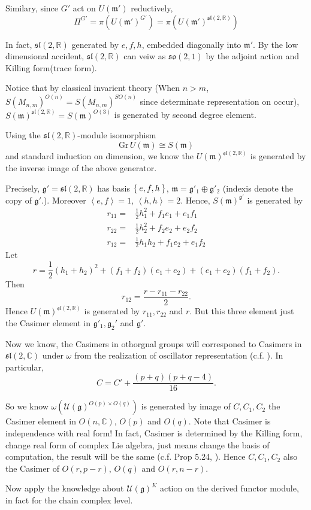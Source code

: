 \documentclass[12pt]{article}
\def\bR{{\mathbb{R}}}
\def\bC{{\mathbb{C}}}
\def\inn#1#2{\left\langle{#1},{#2}\right\rangle}
\def\asl{\mathfrak{sl}}
\def\aso{\mathfrak{so}}
\def\fgg{\mathfrak{g}}
\def\cuu{\mathcal{U}}
\def\fmm{\mathfrak{m}}
\def\Gr{\mathrm{Gr\,}}
\begin{document}
Similary, since $G'$ act on $U(\fmm')$ reductively, 
\[
\Pi^{G'} = \pi(U(\fmm')^{G'}) = \pi(U(\fmm')^{\asl(2,\bR)})
\]

In fact, $\asl(2,\bR)$ generated by $e,f,h$, embedded diagonally into 
$\fmm'$. 
By the low dimensional accident, $\asl(2,\bR)$ can veiw as $\aso(2,1)$
by the adjoint action and Killing form(trace form). 

Notice that  by classical invarient theory (When $n>m$, $S(M_{n,m})^{O(n)}=S(M_{n,m})^{SO(n)}$ since determinate representation on occur),
 $S(\fmm)^{\asl(2,\bR)}=S(\fmm)^{O(3)}$ is generated by second degree element.
 
Using the $\asl(2,\bR)$-module isomorphism 
\[
\Gr U(\fmm) \cong S(\fmm)
\]
and standard induction on dimension, we know the $U(\fmm)^{\asl(2,\bR)}$
is generated by  the inverse image of the above generator.

Precisely, $\fgg'=\asl(2,\bR)$ has basis $\Set{e,f,h}$, 
$\fmm = \fgg'_1\oplus \fgg'_2$ (indexis denote the copy of $\fgg'$.).
Moreover $\inn{e}{f} = 1$, $\inn{h}{h}=2$.  
Hence, $S(\fmm)^{\fgg'}$ is generated by 
\begin{align*}
r_{11} = & \frac{1}{2} h_1^2 + f_1e_1 + e_1f_1 \\
r_{22} = & \frac{1}{2} h_2^2 + f_2e_2 + e_2f_2 \\
r_{12} = & \frac{1}{2} h_1h_2 + f_1e_2 + e_1f_2  
\end{align*}
Let
\[
r = \frac{1}{2} (h_1+h_2)^2 + (f_1+f_2)(e_1+e_2) + (e_1+e_2)(f_1+f_2).
\]
Then 
\[
r_{12} = \frac{r - r_{11} -r_{22}}{2}.
\]
Hence $U(\fmm)^{\asl(2,\bR)}$ is generated by $r_{11},r_{22}$ and $r$. But this 
three element just the Casimer element in $\fgg'_1, \fgg_2'$ and $\fgg'$. 

Now we know, the Casimers in othorgnal groups will corresponed to Casimers 
in $\asl(2,\bC)$ under $\omega$ 
from the realization of oscillator representation (c.f. \cite{Howe1979Opq}).
In particular, 
\[
C = C' + \frac{(p+q)(p+q-4)}{16}.
\]

So we know $\omega(\cuu(\fgg)^{O(p)\times O(q)})$
is generated by image of $C,C_1,C_2$ the Casimer element in $O(n,\bC)$,
$O(p)$ and $O(q)$. Note that Casimer is independence with real form!
In fact, Casimer is determined by the Killing form, change real form of complex
Lie algebra, just means change the basis of computation, the result will be 
the same (c.f. Prop 5.24, \cite{Knapp1996Lie}).
Hence $C, C_1, C_2$ also the Casimer of $O(r,p-r)$, $O(q)$ and $O(r,n-r)$.

Now apply the knowledge about $\cuu(\fgg)^K$ action on 
the derived functor module, in fact for the chain complex level.
\end{document}
